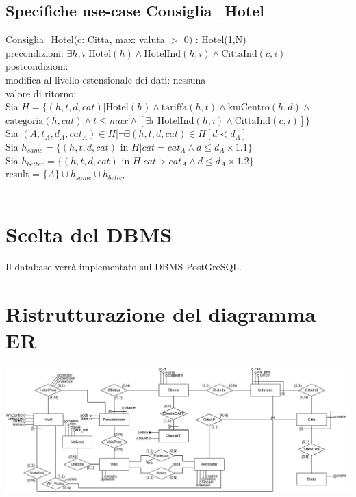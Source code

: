 \documentclass[a4paper,12pt]{report}
\begin{document}
      \section{Specifiche use-case Consiglia\_Hotel}
        \hspace*{1cm}Consiglia\_Hotel(c: Citta, max: valuta $>$ 0) : Hotel(1,N) \\
        \hspace*{2cm}precondizioni: $\exists h, i \text{ Hotel}(h) \wedge \text{HotelInd}(h, i) \wedge \text{CittaInd}(c, i)$ \\
        \hspace*{2cm}postcondizioni: \\
        \hspace*{3cm}modifica al livello estensionale dei dati: nessuna \\
        \hspace*{3cm}valore di ritorno: \\
        \hspace*{4cm}Sia $H = \{(h, t, d, cat) | \text{Hotel}(h) \wedge \text{tariffa}(h, t) \wedge \text{kmCentro}(h, d) \wedge$ \\
        \hspace*{4.5cm}$\text{categoria}(h, cat) \wedge t \leq max \wedge [\exists i \text{ HotelInd}(h, i) \wedge \text{CittaInd}(c, i)]\}$ \\
        \hspace*{4cm}Sia $(A, t_A, d_A, cat_A) \in H | \neg \exists (h, t, d, cat) \in H [d < d_A]$ \\
        \hspace*{4cm}Sia $h_{same} = \{(h, t, d, cat) \text{ in } H | cat = cat_A \wedge d \leq d_A \times 1.1\}$ \\
        \hspace*{4cm}Sia $h_{better} = \{(h, t, d, cat) \text{ in } H | cat > cat_A \wedge d \leq d_A \times 1.2\}$ \\
        \hspace*{4cm}result = $\{A\} \cup h_{same} \cup h_{better}$ \\ \\

    \chapter{Scelta del DBMS}
      Il database verrà implementato sul DBMS PostGreSQL.

    \chapter{Ristrutturazione del diagramma ER}
      \includegraphics[width=1\textwidth]{er_ristr.png}
\end{document}
